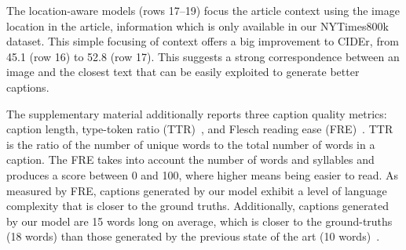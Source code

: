 The location-aware models (rows 17--19) focus the article context using the
image location in the article, information which is only available in our
NYTimes800k dataset. This simple focusing of context offers a big improvement
to CIDEr, from 45.1 (row 16) to 52.8 (row 17). This suggests a strong
correspondence between an image and the closest text that can be easily
exploited to generate better captions.







The supplementary material additionally reports three caption quality metrics:
caption length, type-token ratio (TTR)~\cite{Templin1957CertainLS}, and Flesch
reading ease (FRE)~\cite{Flesch1948,Kincaid1975DerivationON}. TTR is the ratio
of the number of unique words to the total number of words in a caption. The
FRE takes into account the number of words and syllables and produces a score
between 0 and 100, where higher means being easier to read. As measured by
FRE, captions generated by our model exhibit a level of language complexity
that is closer to the ground truths. Additionally, captions generated by our
model are 15 words long on average, which is closer to the ground-truths (18
words) than those generated by the previous state of the art (10
words)~\cite{Biten2019GoodNews}.

